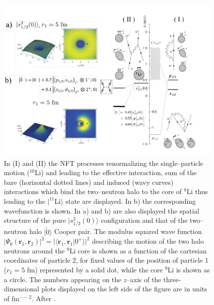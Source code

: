   \begin{figure}
  \centerline{\includegraphics*[width=\textwidth,angle=0]{nutshell/figs/fig1F3.pdf}}
  \caption{In (I) and (II) the NFT processes renormalizing the single--particle motion ($^{10}$Li) and leading to the effective interaction, sum of the bare (horizontal dotted lines) and induced (wavy curves) interactions which bind the two--neutron halo to the core of $^{9}$Li  thus leading to the $|^{11}$Li$\rangle$ state are displayed. In b) the corresponding wavefunction is shown. In a) and b) are also displayed the  spatial structure of the pure $|s_{1/2}^2(0)\rangle$ configuration and that of the two--neutron halo $|\tilde 0\rangle$ Cooper pair. The modulus squared wave function $|\Psi_0(\mathbf{r}_1,\mathbf{r}_2)|^2=|\langle \mathbf{r}_1,\mathbf{r}_1|0^+\rangle|^2$ describing the motion of the two halo neutrons around the $^9$Li core 
  is shown as a function of the cartesian coordinates of particle 2, for fixed values of the
  position of particle 1 ($r_1 = 5$ fm) represented  by a solid dot, while the core $^9$Li is shown as a 
  circle. The numbers appearing on the $z$--axis of the three-dimensional plots displayed on the left side of the figure are in units of fm$^{-−2}$. After \cite{Barranco:01}.}\label{fig1F3}
  \end{figure}

